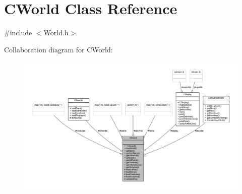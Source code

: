 \hypertarget{class_c_world}{}\section{C\+World Class Reference}
\label{class_c_world}


{\ttfamily \#include $<$World.\+h$>$}



Collaboration diagram for C\+World\+:\nopagebreak
\begin{figure}[H]
\begin{center}
\leavevmode
\includegraphics[width=350pt]{class_c_world__coll__graph}
\end{center}
\end{figure}

